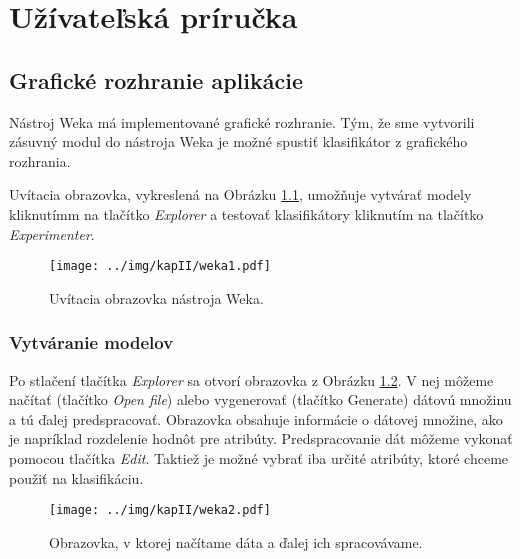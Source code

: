 \chapter{Užívateľská príručka}\label{kapII}
\renewcommand{\figurename}{Obrázok}
\section{Grafické rozhranie aplikácie}
Nástroj Weka má implementované grafické rozhranie.
Tým, že sme vytvorili zásuvný modul do nástroja Weka je možné spustiť klasifikátor z grafického rozhrania. 

Uvítacia obrazovka, vykreslená na Obrázku \ref{fig:gui1}, umožňuje vytvárať modely kliknutímm na tlačítko \emph{Explorer} a testovať klasifikátory kliknutím na tlačítko \emph{Experimenter}. 

\begin{figure}[h]
\centering
\centerline{\mbox{\texttt{[image: ../img/kapII/weka1.pdf]}}}
\caption{Uvítacia obrazovka nástroja Weka.}\label{fig:gui1}
\end{figure}

\subsection*{Vytváranie modelov}
Po stlačení tlačítka \emph{Explorer} sa otvorí obrazovka z Obrázku \ref{fig:gui2}. V nej môžeme načítať (tlačítko \emph{Open file}) alebo vygenerovať (tlačítko Generate) dátovú množinu a tú ďalej predspracovať. Obrazovka obsahuje informácie o dátovej množine, ako je napríklad rozdelenie hodnôt pre atribúty. Predspracovanie dát môžeme vykonať pomocou tlačítka \emph{Edit}. Taktiež je možné vybrať iba určité atribúty, ktoré chceme použiť na klasifikáciu.

\begin{figure}[h]
\centering
\centerline{\mbox{\texttt{[image: ../img/kapII/weka2.pdf]}}}
\caption{Obrazovka, v ktorej načítame dáta a ďalej ich spracovávame.}\label{fig:gui2}
\end{figure}

